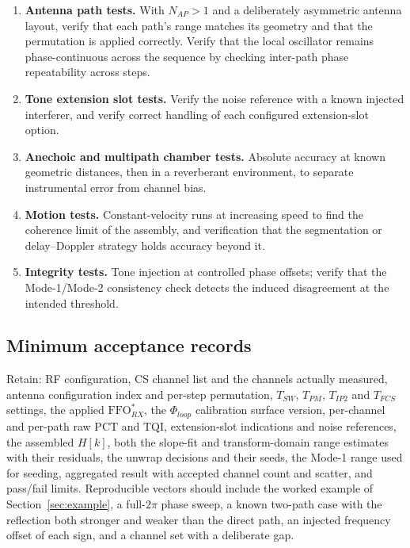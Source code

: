 \documentclass[11pt,a4paper]{article}
\newcommand{\PCT}{\mathrm{PCT}}
\newcommand{\FFO}{\mathrm{FFO}}
\newcommand{\TQI}{\mathrm{TQI}}
\newcommand{\Tsw}{T_{SW}}
\newcommand{\Tpm}{T_{PM}}
\newcommand{\Tipp}{T_{IP2}}
\newcommand{\Nap}{N_{AP}}
\begin{document}
\begin{enumerate}[leftmargin=1.7em,itemsep=2pt]
    the Mode-0 result removes it. Sweep the sign to catch an inverted correction, and sweep $\Tipp$
    across its permitted set: a residual slope of range versus $\Tipp$ is the unambiguous signature
    of an uncorrected or wrongly signed frequency term.
  \item \textbf{Antenna path tests.} With $\Nap>1$ and a deliberately asymmetric antenna layout,
    verify that each path's range matches its geometry and that the permutation is applied correctly.
    Verify that the local oscillator remains phase-continuous across the sequence by checking
    inter-path phase repeatability across steps.
  \item \textbf{Tone extension slot tests.} Verify the noise reference with a known injected
    interferer, and verify correct handling of each configured extension-slot option.
  \item \textbf{Anechoic and multipath chamber tests.} Absolute accuracy at known geometric distances,
    then in a reverberant environment, to separate instrumental error from channel bias.
  \item \textbf{Motion tests.} Constant-velocity runs at increasing speed to find the coherence limit
    of the assembly, and verification that the segmentation or delay--Doppler strategy holds accuracy
    beyond it.
  \item \textbf{Integrity tests.} Tone injection at controlled phase offsets; verify that the
    Mode-1/Mode-2 consistency check detects the induced disagreement at the intended threshold.
\end{enumerate}

\subsection{Minimum acceptance records}

Retain: RF configuration, CS channel list and the channels actually measured, antenna configuration
index and per-step permutation, $\Tsw$, $\Tpm$, $\Tipp$ and $T_{FCS}$ settings, the applied
$\FFO^{*}_{RX}$, the $\Phi_{loop}$ calibration surface version, per-channel and per-path raw $\PCT$
and $\TQI$, extension-slot indications and noise references, the assembled $H[k]$, both the slope-fit
and transform-domain range estimates with their residuals, the unwrap decisions and their seeds, the
Mode-1 range used for seeding, aggregated result with accepted channel count and scatter, and
pass/fail limits. Reproducible vectors should include the worked example of
Section~\ref{sec:example}, a full-$2\pi$ phase sweep, a known two-path case with the reflection both
stronger and weaker than the direct path, an injected frequency offset of each sign, and a channel
set with a deliberate gap.
\end{document}
